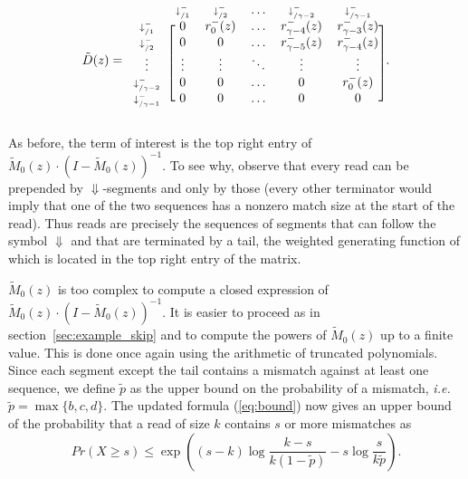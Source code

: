 \documentclass{article}
\begin{document}
\begin{equation*}
\tilde{D}(z) = 
\begin{blockarray}{cccccc}
   & \scriptstyle{\downarrow_{/1}^-} & \scriptstyle{\downarrow_{/2}^-} &
    \ldots & \scriptstyle{\downarrow_{/\gamma-2}^-} &
    \scriptstyle{\downarrow_{/\gamma-1}^-} \\
\begin{block}{c[ccccc]}
\scriptstyle{\downarrow_{/1}^-} & 0 & r_0^-(z) & \ldots &
    r_{\gamma-4}^-(z) & r_{\gamma-3}^-(z) \\
\scriptstyle{\downarrow_{/2}^-} & 0 & 0 & \ldots &
    r_{\gamma-5}^-(z) & r_{\gamma-4}^-(z) \\
\vdots & \vdots & \vdots & \ddots & \vdots & \vdots \\
\scriptstyle{\downarrow_{/\gamma-2}^-} & 0 & 0 & \ldots & 0 & r_0^-(z) \\
\scriptstyle{\downarrow_{/\gamma-1}^-} & 0 & 0 & \ldots & 0 & 0 \\
\end{block}
\end{blockarray}.
\end{equation*}

As before, the term of interest is the top right entry of
$\tilde{M}_0(z)\cdot(I-\tilde{M}_0(z))^{-1}$. To see why, observe that
every read can be prepended by $\Downarrow$-segments and only by those
(every other terminator would imply that one of the two sequences has a
nonzero match size at the start of the read). Thus reads are precisely the
sequences of segments that can follow the symbol $\Downarrow$ and that are
terminated by a tail, the weighted generating function of which is located
in the top right entry of the matrix.

$\tilde{M}_0(z)$ is too complex to compute a closed expression of
$\tilde{M}_0(z)\cdot(I-\tilde{M}_0(z))^{-1}$. It is easier to proceed as
in section~\ref{sec:example_skip} and to compute the powers of
$\tilde{M}_0(z)$ up to a finite value. This is done once again using the
arithmetic of truncated polynomials. Since each segment except the tail
contains a mismatch against at least one sequence, we define $\tilde{p}$
as the upper bound on the probability of a mismatch, \textit{i.e.}
$\tilde{p} = \max\{b,c,d\}$. The updated formula (\ref{eq:bound}) now
gives an upper bound of the probability that a read of size $k$ contains
$s$ or more mismatches as
\begin{equation*}
Pr(X \geq s) \leq \exp \left( (s-k)\log \frac{k-s}{k(1-\tilde{p})} -s\log
\frac{s}{k\tilde{p}} \right).
\end{equation*}
\end{document}
